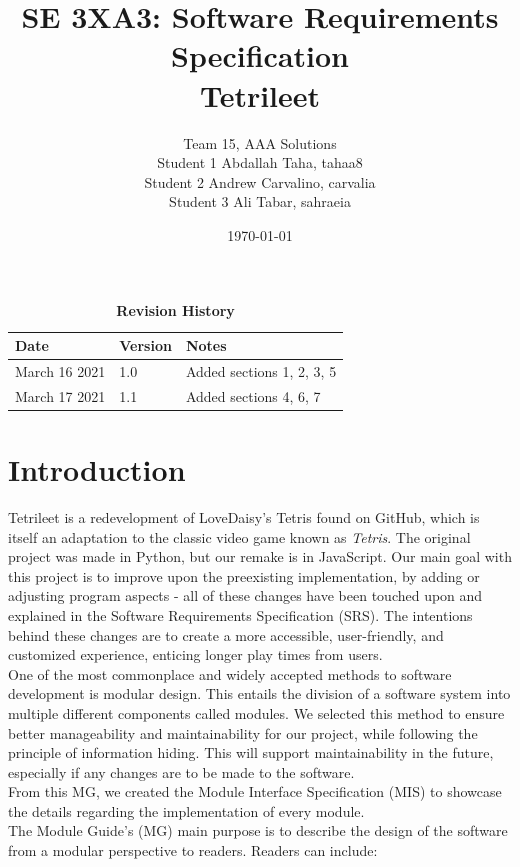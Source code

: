 \documentclass[12pt, titlepage]{article}
\title{SE 3XA3: Software Requirements Specification\\Tetrileet}
\author{Team 15, AAA Solutions
		\\ Student 1 Abdallah Taha, tahaa8
		\\ Student 2 Andrew Carvalino, carvalia
		\\ Student 3 Ali Tabar, sahraeia
}
\date{\today}
\begin{document}
\maketitle

\tableofcontents
\listoftables
\listoffigures
\newpage
\begin{table}[h!]
\caption{\bf Revision History}
\begin{tabularx}{\textwidth}{p{3cm}p{2cm}X}
\toprule {\bf Date} & {\bf Version} & {\bf Notes}\\
\midrule
March 16 2021 & 1.0 & Added sections 1, 2, 3, 5\\
March 17 2021 & 1.1 & Added sections 4, 6, 7\\
\bottomrule
\end{tabularx}
\end{table}

\newpage


\section{Introduction}





Tetrileet is a redevelopment of LoveDaisy's Tetris found on GitHub, which is itself an adaptation to the classic video game known as \textit{Tetris}. The original project was made in Python, but our remake is in JavaScript. Our main goal with this project is to improve upon the preexisting implementation, by adding or adjusting program aspects - all of these changes have been touched upon and explained in the Software Requirements Specification (SRS). The intentions behind these changes are to create a more accessible, user-friendly, and customized experience, enticing longer play times from users.
\\One of the most commonplace and widely accepted methods to software development is modular design. This entails the division of a software system into multiple different components called modules. We selected this method to ensure better manageability and maintainability for our project, while following the principle of information hiding. This will support maintainability in the future, especially if any changes are to be made to the software.\\
From this MG, we created the Module Interface Specification (MIS) to showcase the details regarding the implementation of every module.
\\The Module Guide's (MG) main purpose is to describe the design of the software from a modular perspective to readers. Readers can include:
\end{document}
